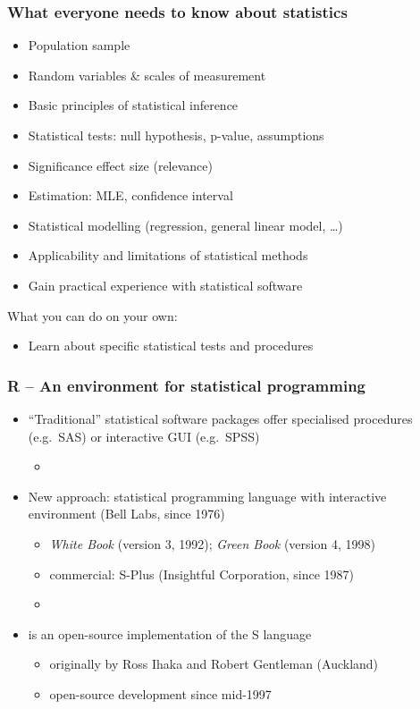 \documentclass[t]{beamer} %
\begin{document}
\begin{frame}
  \frametitle{What everyone needs to know about statistics}

  \begin{itemize}
  \item<2-> Population \vs sample
  \item<3-> Random variables \& scales of measurement
  \item<4-> Basic principles of statistical inference
  \item<5-> Statistical tests: null hypothesis, p-value, assumptions
  \item<6-> Significance \vs effect size (relevance)
  \item<7-> Estimation: MLE, confidence interval
  \item<8-> Statistical modelling (regression, general linear model, \ldots)
  \item<9-> Applicability and limitations of statistical methods
  \item<10->[\hand] Gain practical experience with statistical software
  \end{itemize}

  \gap{}
  What you can do on your own:
  \begin{itemize}
  \item Learn about specific statistical tests and procedures
  \end{itemize}
\end{frame}

\begin{frame}
  \frametitle{\textbf{R} -- An environment for statistical programming}

  \begin{itemize}
  \item<1-> ``Traditional'' statistical software packages offer specialised
    procedures (e.g.\ SAS) or interactive GUI (e.g.\ SPSS)
    \begin{itemize}
    \item[]
    \end{itemize}
  \item<2-> New approach: statistical programming language  with interactive
    environment (Bell Labs, since 1976)
    \begin{itemize}
    \item \emph{White Book} (version 3, 1992); \emph{Green Book} (version
      4, 1998)
    \item commercial: S-Plus (Insightful Corporation, since 1987)
    \item[]
    \end{itemize}
  \item<3->  is an open-source implementation of the S language
    \begin{itemize}
    \item originally by Ross Ihaka and Robert Gentleman (Auckland)
    \item open-source development since mid-1997
    \end{itemize}
  \end{itemize}
\end{frame}
\end{document}
